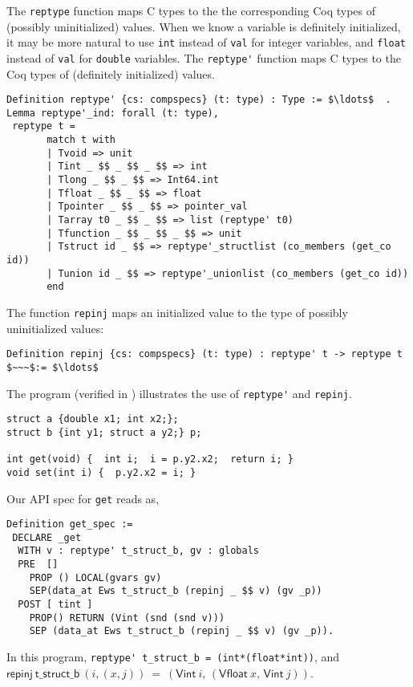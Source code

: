 \documentclass[12pt,fleqn,openany,oneside,showtrims]{memoir}
\begin{document}
The \lstinline{reptype} function maps C types to
the the corresponding Coq types of (possibly uninitialized) values.
When we know a variable is definitely initialized,
it may be more natural to use \lstinline{int} instead of \lstinline{val}
for integer variables, and \lstinline{float} instead of \lstinline{val}
for \lstinline{double} variables.
The \lstinline{reptype'} function maps C types
to the Coq types of (definitely initialized) values.
\begin{lstlisting}
Definition reptype' {cs: compspecs} (t: type) : Type := $\ldots$  .
Lemma reptype'_ind: forall (t: type),
 reptype t =
       match t with
       | Tvoid => unit
       | Tint _ $$ _ $$ _ $$ => int
       | Tlong _ $$ _ $$ => Int64.int
       | Tfloat _ $$ _ $$ => float
       | Tpointer _ $$ _ $$ => pointer_val
       | Tarray t0 _ $$ _ $$ => list (reptype' t0)
       | Tfunction _ $$ _ $$ _ $$ => unit
       | Tstruct id _ $$ => reptype'_structlist (co_members (get_co id))
       | Tunion id _ $$ => reptype'_unionlist (co_members (get_co id))
       end
\end{lstlisting}
\vspace{-3ex}
The function \lstinline{repinj} maps an initialized value to
the type of possibly uninitialized values:
\begin{lstlisting}
Definition repinj {cs: compspecs} (t: type) : reptype' t -> reptype t $~~~$:= $\ldots$
\end{lstlisting}

The program  (verified in
)  illustrates the use of \lstinline{reptype'}
and \lstinline{repinj}.
\begin{lstlisting}
struct a {double x1; int x2;};
struct b {int y1; struct a y2;} p;

int get(void) {  int i;  i = p.y2.x2;  return i; }
void set(int i) {  p.y2.x2 = i; }
\end{lstlisting}
Our API spec for \lstinline{get} reads as,
\begin{lstlisting}
Definition get_spec :=
 DECLARE _get
  WITH v : reptype' t_struct_b, gv : globals
  PRE  []
    PROP () LOCAL(gvars gv)
    SEP(data_at Ews t_struct_b (repinj _ $$ v) (gv _p))
  POST [ tint ]
    PROP() RETURN (Vint (snd (snd v)))
    SEP (data_at Ews t_struct_b (repinj _ $$ v) (gv _p)).
\end{lstlisting}
In this program, \lstinline{reptype' t_struct_b = (int*(float*int))},
and \newline
$\mathsf{repinj}~\mathsf{t\_struct\_b}~(i,(x,j))~=~(\mathsf{Vint}~i,\,(\mathsf{Vfloat}~x,\,\mathsf{Vint}~j))$.
\end{document}
